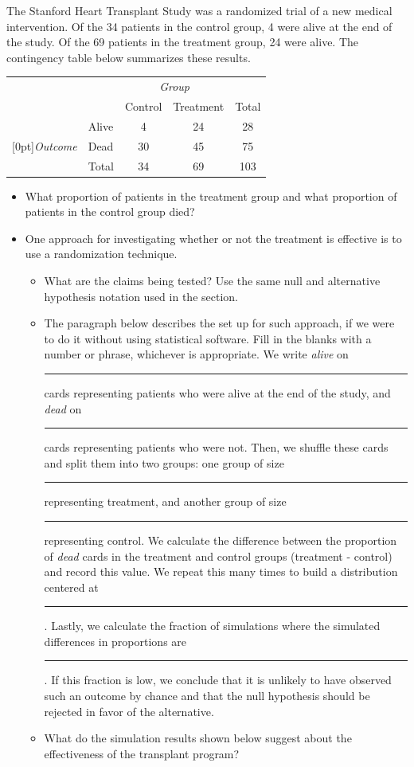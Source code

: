The Stanford Heart Transplant Study was a randomized trial of a new medical intervention. Of the 34 patients in the control group, 4 were alive at the end of the study. Of the 69 patients in the treatment group, 24 were alive. The contingency table below summarizes these results.
\begin{center}
\begin{tabular}{ll  cc c} 
							&		& \multicolumn{2}{c}{\textit{Group}} \\
\cline{3-4}
							&		& Control 	& Treatment 	& Total	\\
\cline{2-5}
							& Alive 	& 4	 	& 24			& 28 	\\
\raisebox{1.5ex}[0pt]{\emph{Outcome}} & Dead	& 30		& 45	 		& 75\\
\cline{2-5}
							& Total	& 34		& 69			& 103
\end{tabular}
\end{center}
\begin{itemize}
\item What proportion of patients in the treatment group and what proportion of patients in the control group died?
\item One approach for investigating whether or not the treatment is effective is to use a randomization technique.
\begin{itemize}
\item What are the claims being tested? Use the same null and alternative hypothesis notation used in the section.
\item  The paragraph below describes the set up for such approach, if we were to do it without using statistical software. Fill in the blanks with a number or phrase, whichever is appropriate.
We write \textit{alive} on \rule{2cm}{0.5pt} cards representing patients who were alive at the end of the study, and \textit{dead} on \rule{2cm}{0.5pt} cards representing patients who were not. Then, we shuffle these cards and split them into two groups: one group of size \rule{2cm}{0.5pt} representing treatment, and another group of size \rule{2cm}{0.5pt} representing control. We calculate the difference between the proportion of \textit{dead} cards in the treatment and control groups (treatment - control) and record this value. We repeat this many times to build a distribution centered at \rule{2cm}{0.5pt}. Lastly, we calculate the fraction of simulations where the simulated differences in proportions are \rule{2cm}{0.5pt}. If this fraction is low, we conclude that it is unlikely to have observed such an outcome by chance and that the null hypothesis should be rejected in favor of the alternative.
\item What do the simulation results shown below suggest about the effectiveness of the transplant program?
\end{itemize}
\end{itemize}
